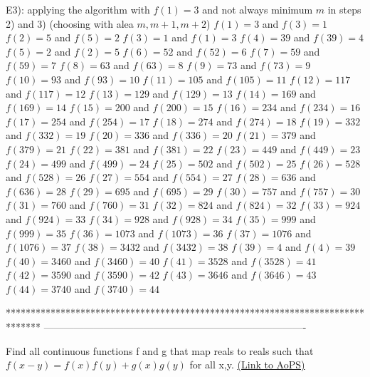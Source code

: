 \begin{solution}
E3): applying the algorithm with $f(1)=3$ and not always minimum $m$ in steps 2) and 3) (choosing with alea $m,m+1,m+2$)
$f(1)=3$ and $f(3)=1$
$f(2)=5$ and $f(5)=2$
$f(3)=1$ and $f(1)=3$
$f(4)=39$ and $f(39)=4$
$f(5)=2$ and $f(2)=5$
$f(6)=52$ and $f(52)=6$
$f(7)=59$ and $f(59)=7$
$f(8)=63$ and $f(63)=8$
$f(9)=73$ and $f(73)=9$
$f(10)=93$ and $f(93)=10$
$f(11)=105$ and $f(105)=11$
$f(12)=117$ and $f(117)=12$
$f(13)=129$ and $f(129)=13$
$f(14)=169$ and $f(169)=14$
$f(15)=200$ and $f(200)=15$
$f(16)=234$ and $f(234)=16$
$f(17)=254$ and $f(254)=17$
$f(18)=274$ and $f(274)=18$
$f(19)=332$ and $f(332)=19$
$f(20)=336$ and $f(336)=20$
$f(21)=379$ and $f(379)=21$
$f(22)=381$ and $f(381)=22$
$f(23)=449$ and $f(449)=23$
$f(24)=499$ and $f(499)=24$
$f(25)=502$ and $f(502)=25$
$f(26)=528$ and $f(528)=26$
$f(27)=554$ and $f(554)=27$
$f(28)=636$ and $f(636)=28$
$f(29)=695$ and $f(695)=29$
$f(30)=757$ and $f(757)=30$
$f(31)=760$ and $f(760)=31$
$f(32)=824$ and $f(824)=32$
$f(33)=924$ and $f(924)=33$
$f(34)=928$ and $f(928)=34$
$f(35)=999$ and $f(999)=35$
$f(36)=1073$ and $f(1073)=36$
$f(37)=1076$ and $f(1076)=37$
$f(38)=3432$ and $f(3432)=38$
$f(39)=4$ and $f(4)=39$
$f(40)=3460$ and $f(3460)=40$
$f(41)=3528$ and $f(3528)=41$
$f(42)=3590$ and $f(3590)=42$
$f(43)=3646$ and $f(3646)=43$
$f(44)=3740$ and $f(3740)=44$
\end{solution}
*******************************************************************************
-------------------------------------------------------------------------------

\begin{problem}
	Find all continuous functions f and g that map reals to reals such that $f(x-y)=f(x)f(y)+g(x)g(y)$ for all x,y.
	\flushright \href{https://artofproblemsolving.com/community/c6h529829}{(Link to AoPS)}
\end{problem}



